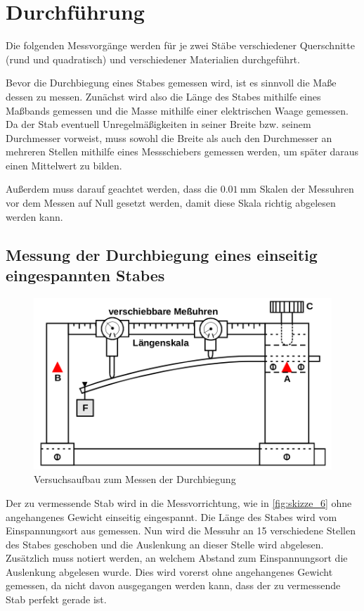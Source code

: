 \section{Durchführung}
\label{sec:Durchführung}

Die folgenden Messvorgänge werden für je zwei Stäbe verschiedener Querschnitte (rund und quadratisch) und verschiedener Materialien durchgeführt.

Bevor die Durchbiegung eines Stabes gemessen wird, ist es sinnvoll die Maße dessen zu messen.
Zunächst wird also die Länge des Stabes mithilfe eines Maßbands gemessen und die Masse mithilfe einer elektrischen Waage gemessen.
Da der Stab eventuell Unregelmäßigkeiten in seiner Breite bzw. seinem Durchmesser vorweist, muss sowohl die Breite als auch den Durchmesser an mehreren Stellen mithilfe eines Messschiebers gemessen werden, um später daraus einen Mittelwert zu bilden.

Außerdem muss darauf geachtet werden, dass die $\SI{0.01}{\milli\meter}$ Skalen der Messuhren vor dem Messen auf Null gesetzt werden, damit diese Skala richtig abgelesen werden kann.

\subsection{Messung der Durchbiegung eines einseitig eingespannten Stabes}
\label{sec:Durchführung_Einseitig}

\begin{figure}
    \centering
    \includegraphics[width=\textwidth]{images/skizze_6.png}
    \caption{Versuchsaufbau zum Messen der Durchbiegung\cite{V103}}
    \label{fig:skizze_6}
\end{figure}

Der zu vermessende Stab wird in die Messvorrichtung, wie in \autoref{fig:skizze_6} ohne angehangenes Gewicht einseitig eingespannt.
Die Länge des Stabes wird vom Einspannungsort aus gemessen.
Nun wird die Messuhr an 15 verschiedene Stellen des Stabes geschoben und die Auslenkung an dieser Stelle wird abgelesen. Zusätzlich muss notiert werden, an welchem Abstand zum Einspannungsort die Auslenkung abgelesen wurde.
Dies wird vorerst ohne angehangenes Gewicht gemessen, da nicht davon ausgegangen werden kann, dass der zu vermessende Stab perfekt gerade ist.

